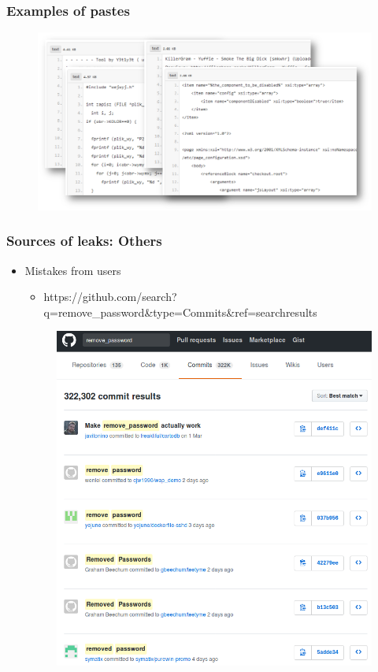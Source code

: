 \begin{frame}[t,plain]
    \frametitle{Examples of pastes}
    \begin{figure}
        \includegraphics[scale=0.32, angle=0]{images/pastes-ex.png}
    \end{figure}
\end{frame}

\begin{frame}
    \frametitle{Sources of leaks: Others}
        \begin{itemize}
            \item Mistakes from users
            \begin{itemize}
                \item \tiny{https://github.com/}\normalsize{search?q=remove\_password}\tiny{\&type=Commits\&ref=searchresults}
            \end{itemize}
            \begin{figure}
                \includegraphics[scale=0.4]{images/git-pass.png}
            \end{figure}
        \end{itemize}
\end{frame}

